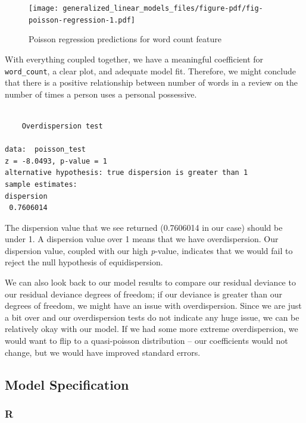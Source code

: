 \documentclass[
  letterpaper,
]{krantz}
\begin{document}
\begin{figure}

{\centering \texttt{[image: generalized\_linear\_models\_files/figure-pdf/fig-poisson-regression-1.pdf]}

}

\caption{\label{fig-poisson-regression}Poisson regression predictions
for word count feature}

\end{figure}

With everything coupled together, we have a meaningful coefficient for
\texttt{word\_count}, a clear plot, and adequate model fit. Therefore,
we might conclude that there is a positive relationship between number
of words in a review on the number of times a person uses a personal
possessive.

\begin{verbatim}

    Overdispersion test

data:  poisson_test
z = -8.0493, p-value = 1
alternative hypothesis: true dispersion is greater than 1
sample estimates:
dispersion 
 0.7606014 
\end{verbatim}

The dispersion value that we see returned (0.7606014 in our case) should
be under 1. A dispersion value over 1 means that we have overdispersion.
Our dispersion value, coupled with our high \emph{p}-value, indicates
that we would fail to reject the null hypothesis of equidispersion.

We can also look back to our model results to compare our residual
deviance to our residual deviance degrees of freedom; if our deviance is
greater than our degrees of freedom, we might have an issue with
overdispersion. Since we are just a bit over and our overdispersion
tests do not indicate any huge issue, we can be relatively okay with our
model. If we had some more extreme overdispersion, we would want to flip
to a quasi-poisson distribution -- our coefficients would not change,
but we would have improved standard errors.

\subsection{Model Specification}\label{model-specification}

\subsubsection{R}
\end{document}
